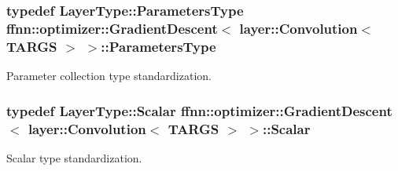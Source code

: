 \hypertarget{classffnn_1_1optimizer_1_1_gradient_descent_3_01layer_1_1_convolution_3_01_t_a_r_g_s_01_4_01_4_a0bbe4560ab81eacf8e75ac5510ad696e}{
\subsubsection[{Parameters\-Type}]{\setlength{\rightskip}{0pt plus 5cm}typedef {\bf Layer\-Type\-::\-Parameters\-Type} {\bf ffnn\-::optimizer\-::\-Gradient\-Descent}$<$ {\bf layer\-::\-Convolution}$<$ {\bf T\-A\-R\-G\-S} $>$ $>$\-::{\bf Parameters\-Type}}}\label{classffnn_1_1optimizer_1_1_gradient_descent_3_01layer_1_1_convolution_3_01_t_a_r_g_s_01_4_01_4_a0bbe4560ab81eacf8e75ac5510ad696e}


Parameter collection type standardization. 

\hypertarget{classffnn_1_1optimizer_1_1_gradient_descent_3_01layer_1_1_convolution_3_01_t_a_r_g_s_01_4_01_4_a6995cac929c8df2dd70dddf488998e66}{
\subsubsection[{Scalar}]{\setlength{\rightskip}{0pt plus 5cm}typedef Layer\-Type\-::\-Scalar {\bf ffnn\-::optimizer\-::\-Gradient\-Descent}$<$ {\bf layer\-::\-Convolution}$<$ {\bf T\-A\-R\-G\-S} $>$ $>$\-::{\bf Scalar}}}\label{classffnn_1_1optimizer_1_1_gradient_descent_3_01layer_1_1_convolution_3_01_t_a_r_g_s_01_4_01_4_a6995cac929c8df2dd70dddf488998e66}


Scalar type standardization. 

